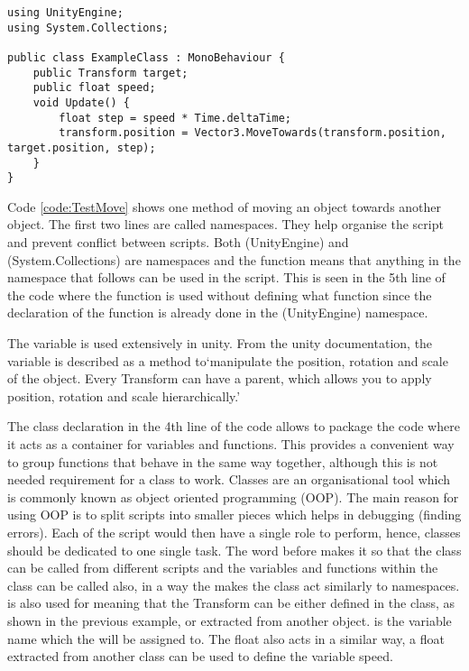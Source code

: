 \bigskip
\begin{code1}
\begin{verbatim}
using UnityEngine;
using System.Collections;

public class ExampleClass : MonoBehaviour {
    public Transform target;
    public float speed;
    void Update() {
        float step = speed * Time.deltaTime;
        transform.position = Vector3.MoveTowards(transform.position, target.position, step);
    }
}
\end{verbatim}
\label{code:TestMove}
\end{code1}


Code \ref{code:TestMove} shows one method of moving an object towards another object. The first two lines are called namespaces. They help organise the script and prevent conflict between scripts. Both (UnityEngine) and (System.Collections) are namespaces and the  function means that anything in the namespace that follows can be used in the script. This is seen in the 5th line of the code where the  function is used without defining what function since the declaration of the function is already done in the (UnityEngine) namespace. 

The  variable is used extensively in unity. From the unity documentation, the  variable is described as a method to`manipulate the position, rotation and scale of the object. Every Transform can have a parent, which allows you to apply position, rotation and scale hierarchically.'

The class declaration in the 4th line of the code allows to package the code where it acts as a container for variables and functions. This provides a convenient way to group functions that behave in the same way together, although this is not needed requirement for a class to work. Classes are an organisational tool which is commonly known as object oriented programming (OOP). The main reason for using OOP is to split scripts into smaller pieces which helps in debugging (finding errors). Each of the script would then have a single role to perform, hence, classes should be dedicated to one single task. The word  before  makes it so that the class can be called from different scripts and the variables and functions within the class can be called also, in a way the  makes the class act similarly to namespaces.  is also used for  meaning that the Transform can be either defined in the class, as shown in the previous example, or extracted from another object.  is the variable name which the  will be assigned to. The float  also acts in a similar way, a float extracted from another class can be used to define the variable speed.

